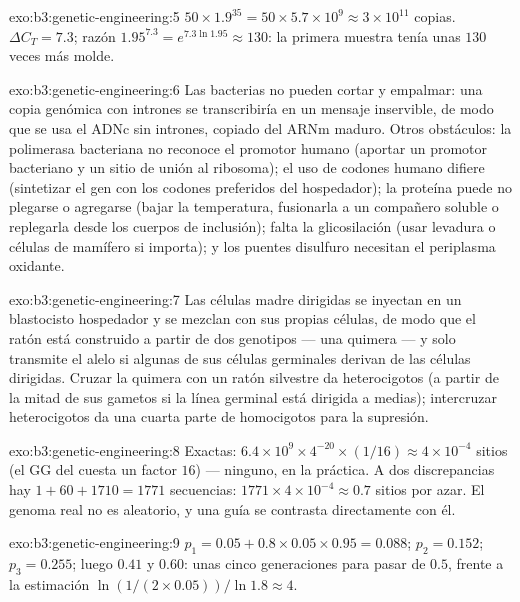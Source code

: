 \begin{solution}{exo:b3:genetic-engineering:5}
$50\times 1.9^{35} = 50\times 5.7\times 10^{9} \approx 3\times 10^{11}$
copias. $\Delta C_{T} = 7.3$; razón $1.95^{7.3} = e^{7.3\ln 1.95}
\approx 130$: la primera muestra tenía unas $130$ veces más molde.
\end{solution}

\begin{solution}{exo:b3:genetic-engineering:6}
Las bacterias no pueden cortar y empalmar: una copia genómica con
intrones se transcribiría en un mensaje inservible, de modo que se usa el
ADNc sin intrones, copiado del ARNm maduro. Otros obstáculos: la
polimerasa bacteriana no reconoce el promotor humano (aportar un promotor
bacteriano y un sitio de unión al ribosoma); el uso de codones humano
difiere (sintetizar el gen con los codones preferidos del hospedador); la
proteína puede no plegarse o agregarse (bajar la temperatura, fusionarla
a un compañero soluble o replegarla desde los cuerpos de inclusión);
falta la glicosilación (usar levadura o células de mamífero si importa);
y los puentes disulfuro necesitan el periplasma oxidante.
\end{solution}

\begin{solution}{exo:b3:genetic-engineering:7}
Las células madre dirigidas se inyectan en un blastocisto hospedador y se
mezclan con sus propias células, de modo que el ratón está construido a
partir de dos genotipos --- una quimera --- y solo transmite el alelo si
algunas de sus células germinales derivan de las células dirigidas.
Cruzar la quimera con un ratón silvestre da heterocigotos (a partir de la
mitad de sus gametos si la línea germinal está dirigida a medias);
intercruzar heterocigotos da una cuarta parte de homocigotos para la
supresión.
\end{solution}

\begin{solution}{exo:b3:genetic-engineering:8}
Exactas: $6.4\times 10^{9}\times 4^{-20}\times (1/16) \approx 4\times
10^{-4}$ sitios (el GG del  cuesta un factor $16$) --- ninguno, en la
práctica. A dos discrepancias hay $1 + 60 + 1710 = 1771$ secuencias:
$1771\times 4\times 10^{-4} \approx 0.7$ sitios por azar. El genoma real
no es aleatorio, y una guía se contrasta directamente con él.
\end{solution}

\begin{solution}{exo:b3:genetic-engineering:9}
$p_{1} = 0.05 + 0.8\times 0.05\times 0.95 = 0.088$; $p_{2} = 0.152$;
$p_{3} = 0.255$; luego $0.41$ y $0.60$: unas cinco generaciones para
pasar de $0.5$, frente a la estimación
$\ln(1/(2\times 0.05))/\ln 1.8 \approx 4$.
\end{solution}

